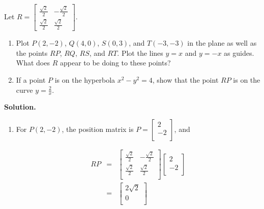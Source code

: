 \documentclass{ximera}
\begin{document}
\begin{example}  \label{rotationmatrixex} Let $R = \left[ \begin{array}{rr} \frac{\sqrt{2}}{2} & -\frac{\sqrt{2}}{2} \\   \frac{\sqrt{2}}{2} & \frac{\sqrt{2}}{2} \end{array} \right]$.

\begin{enumerate}

\item Plot $P(2,-2)$, $Q(4,0)$, $S(0,3)$, and $T(-3,-3)$ in the plane as well as the points $RP$, $RQ$, $RS$, and $RT$. Plot the lines $y=x$ and $y=-x$ as guides.  What does $R$ appear to be doing to these points?

\item  If a point $P$ is on the hyperbola $x^2-y^2=4$, show that the point $RP$ is on the curve $y = \frac{2}{x}$.


\end{enumerate}

{\bf Solution.}  \begin{enumerate} \item  For $P(2,-2)$, the position matrix is  $P = \left[ \begin{array}{r} 2 \\ -2 \\ \end{array} \right]$, and 

\[\begin{array}{rcl}

RP & = &  \left[ \begin{array}{rr} \frac{\sqrt{2}}{2} & -\frac{\sqrt{2}}{2} \\   \frac{\sqrt{2}}{2} & \frac{\sqrt{2}}{2} \\ \end{array} \right]\left[ \begin{array}{r} 2 \\   -2 \\ \end{array} \right] \\  

& = & \left[ \begin{array}{r} 2\sqrt{2} \\ 0 \\ \end{array} \right] \\

\end{array}\]


\end{enumerate}
\end{example}
\end{document}
